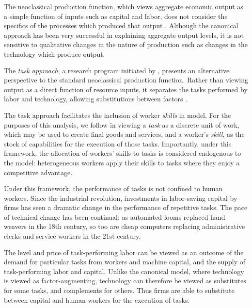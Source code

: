 \documentclass[a4paper,11pt]{article}
\begin{document}
The neoclassical production function, which views aggregate economic output as a simple function of inputs such as capital and labor, does not consider the specifics of the processes which produced that output \citep{Acemoglu2011}. Although the canonical approach has been very successful in explaining aggregate output levels, it is not sensitive to qualitative changes in the nature of production such as changes in the technology which produce output. 




The {\em task approach}, a research program initiated by \citet{Levy2003}, presents an alternative perspective to the standard neoclassical production function. Rather than viewing output as a direct function of resource inputs, it separates the tasks performed by labor and technology, allowing  substitutions between factors \citep{Autor2013,Acemoglu2011}. 

The task approach facilitates the inclusion of worker \emph{skills} in model. For the purposes of this analysis, we follow \citet{Autor2013} in viewing a \emph{task} as a discrete unit of work, which may be used to create final goods and services, and a worker's \emph{skill}, as the stock of capabilities for the execution of those tasks. Importantly, under this framework, the allocation of workers' skills to tasks is considered endogenous to the model: heterogeneous workers apply their skills to tasks where they enjoy a competitive advantage.

Under this framework, the performance of tasks is not confined to human workers. Since the industrial revolution, investments in labor-saving capital by firms has seen a dramatic change in the performance of repetitive tasks. The pace of technical change has been continual: as automated looms replaced hand-weavers in the 18th century, so too are cheap computers replacing administrative clerks and service workers in the 21st century.

The level and price of task-performing labor can be 
viewed as an outcome of the demand for particular tasks from workers and machine capital, and the supply of task-performing labor and capital. Unlike the canonical model, where technology is viewed as factor-augmenting,  technology can therefore be viewed as substitutes for some tasks, and complements for others. Thus firms are able to substitute between capital and human workers for the execution of tasks.
\end{document}

